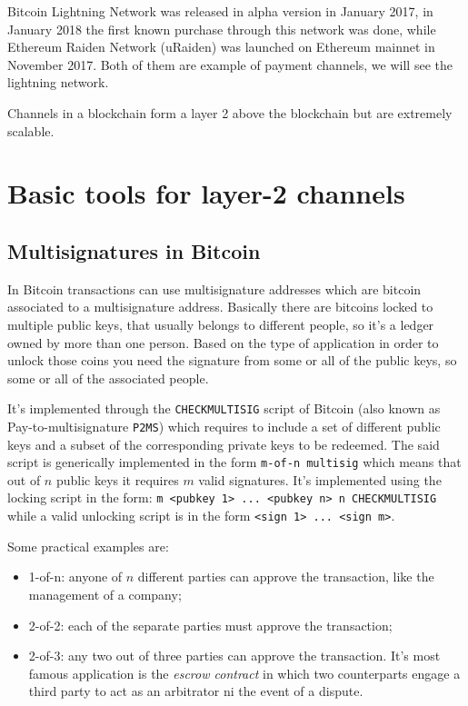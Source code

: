 Bitcoin Lightning Network was released in alpha version in January 2017, in January 2018 the first known purchase through this network was done, while Ethereum Raiden Network (uRaiden) was launched on Ethereum mainnet in November 2017.
Both of them are example of payment channels, we will see the lightning network.

Channels in a blockchain form a layer 2 above the blockchain but are extremely scalable.

\section{Basic tools for layer-2 channels}
\subsection{Multisignatures in Bitcoin}
In Bitcoin transactions can use multisignature addresses which are bitcoin associated to a multisignature address.
Basically there are bitcoins locked to multiple public keys, that usually belongs to different people, so it's a ledger owned by more than one person.
Based on the type of application in order to unlock those coins you need the signature from some or all of the public keys, so some or all of the associated people.

It's implemented through the \verb|CHECKMULTISIG| script of Bitcoin (also known as Pay-to-multisignature \verb|P2MS|) which requires to include a set of different public keys and a subset of the corresponding private keys to be redeemed.
The said script is generically implemented in the form \verb|m-of-n multisig| which means that out of $n$ public keys it requires $m$ valid signatures.
It's implemented using the locking script in the form: \verb|m <pubkey 1> ... <pubkey n> n CHECKMULTISIG| while a valid unlocking script is in the form \verb|<sign 1> ... <sign m>|.

Some practical examples are:
\begin{itemize}
    \item 1-of-n: anyone of $n$ different parties can approve the transaction, like the management of a company;
    \item 2-of-2: each of the separate parties must approve the transaction;
    \item 2-of-3: any two out of three parties can approve the transaction.
    It's most famous application is the \emph{escrow contract} in which two counterparts engage a third party to act as an arbitrator ni the event of a dispute.
\end{itemize}

